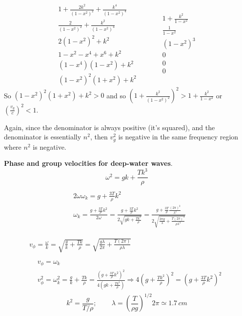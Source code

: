 \documentclass[twoside,10pt]{amsart}
\newcommand{\problemhead}[1]
  {\smallskip
   \noindent{\large\bf Problem #1.}
   \smallskip}
\begin{document}
\begin{enumerate}
\[
\begin{gathered}
  1 + \frac{2k^2}{(1-x^2)^2 } + \frac{k^4}{(1-x^2)^4} \\
  \frac{ 2 }{ (1-x^2)^2 } + \frac{k^2 }{ (1-x^2)^4} \\
  2(1-x^2)^2 + k^2 \\
    1 - x^2 - x^4 +x^6 +k^2 \\
  (1-x^4)(1-x^2) +k^2 \\
  (1-x^2)^2(1+x^2) + k^2 
\end{gathered} \quad \quad \quad 
\begin{gathered}
  1 + \frac{k^2}{1-x^2} \\
  \frac{1}{1-x^2} \\
  (1-x^2)^3 \\
  0 \\
  0 \\
  0 \\
\end{gathered}
\]
So $(1-x^2)^2(1+x^2) + k^2 >0$ and so $\left( 1 + \frac{ k^2}{ (1-x^2)^2 } \right)^2  > 1 + \frac{k^2}{ 1-x^2} $ or $\left( \frac{v_g}{c} \right)^2 < 1$.  

Again, since the denominator is always positive (it's squared), and the denominator is essentially $n^2$, then $v_g^2$ is negative in the same frequency region where $n^2$ is negative.  

\end{enumerate}

\problemhead{6.19} \textbf{ Phase and group velocities for deep-water waves}.  
\[
  \omega^2 = gk + \frac{Tk^3}{\rho} 
\]
\[
\begin{gathered}
  \quad \\
  \begin{aligned}
    & 2 \omega \omega_k = g + \frac{ 3T}{\rho } k^2 \\
    & \omega_k = \frac{ g + \frac{ 3 T}{\rho} k^2 }{ 2 \omega } = \frac{ g + \frac{3T}{\rho }k^2 }{ 2 \sqrt{ gk + \frac{Tk^3}{\rho } }} = \frac{ g + \frac{3T}{\rho} \frac{ (2\pi)^2 }{\lambda^2} }{ 2 \sqrt{ \frac{2\pi g}{\lambda} + \frac{ T(2\pi)^3}{ \rho \lambda^3 } } } 
  \end{aligned} \\
\end{gathered}
\]
\[
\begin{gathered}
  \quad \\
  v_{\phi} = \frac{ \omega}{k}  = \sqrt{ \frac{g}{k} + \frac{Tk}{\rho} } = \sqrt{ \frac{ g\lambda}{2\pi }  + \frac{T (2\pi)}{ \rho \lambda} }  \\
\quad \\
\begin{aligned}
  & v_{\phi} = \omega_k \\
  & v^2_{\phi}  = \omega_k^2 = \frac{g}{k} + \frac{Tk}{\rho} = \frac{ \left( g + \frac{3T}{\rho} k^2 \right)^2 }{ 4 \left( gk + \frac{T k^3 }{ \rho} \right) } \Longrightarrow 4 \left( g + \frac{Tk^2}{\rho} \right)^2 = \left( g + \frac{3T}{\rho} k^2 \right)^2 
\end{aligned} 
\end{gathered}
\]
\[
k^2 = \frac{  g }{  T/\rho }; \quad \quad \, \lambda = \left(  \frac{T}{ \rho g} \right)^{1/2} 2\pi \simeq \boxed{ 1.7 \, cm }
\]
\end{document}
